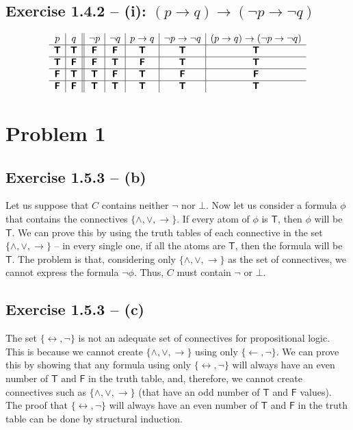 \documentclass[11pt]{article}
\newcommand{\TTT}{\bm{\mathsf{T}}}
\newcommand{\FFF}{\bm{\mathsf{F}}}
\begin{document}
\subsection*{Exercise 1.4.2 -- (i): $(p \to q) \to (\neg{p} \to \neg{q})$}
\[
\begin{array}{ c | c || c | c | c | c | c}
 p & q & \neg{p} & \neg{q}& p \to q & \neg{p} \to \neg{q} & (p \to q) \to (\neg{p} \to \neg{q})
\\ \hline 
 \TTT & \TTT & \FFF & \FFF & \TTT & \TTT & \TTT \\ \hline  
 \TTT & \FFF & \FFF & \TTT & \FFF & \TTT & \TTT \\ \hline  
 \FFF & \TTT & \TTT & \FFF & \TTT & \FFF & \FFF \\ \hline  
 \FFF & \FFF & \TTT & \TTT & \TTT & \TTT & \TTT
\end{array}
\]

\section*{Problem 1}

\subsection*{Exercise 1.5.3 -- (b)}
Let us suppose that $C$ contains neither $\lnot$ nor $\bot$. Now let us consider a formula $\phi$ that contains the connectives $\{\land, \lor, \to\}$. If every atom of $\phi$ is $\TTT$, then $\phi$ will be $\TTT$. We can prove this by using the truth tables of each connective in the set $\{\land, \lor, \to\}$ -- in every single one, if all the atoms are $\TTT$, then the formula will be $\TTT$. The problem is that, considering only $\{\land, \lor, \to\}$ as the set of connectives, we cannot express the formula $\neg{\phi}$. Thus, $C$ must contain $\neg$ or $\bot$.


\subsection*{Exercise 1.5.3 -- (c)}
The set $\{\leftrightarrow, \neg\}$ is not an adequate set of connectives for propositional logic. This is because we cannot create $\{\land, \lor, \to\}$ using only $\{\leftarrow, \neg\}$. We can prove this by showing that any formula using only $\{\leftrightarrow, \neg\}$ will always have an even number of $\TTT$ and $\FFF$ in the truth table, and, therefore, we cannot create connectives such as $\{\land, \lor, \to\}$ (that have an odd number of $\TTT$ and $\FFF$ values). The proof that $\{\leftrightarrow, \neg\}$ will always have an even number of $\TTT$ and $\FFF$ in the truth table can be done by structural induction.
\end{document}
